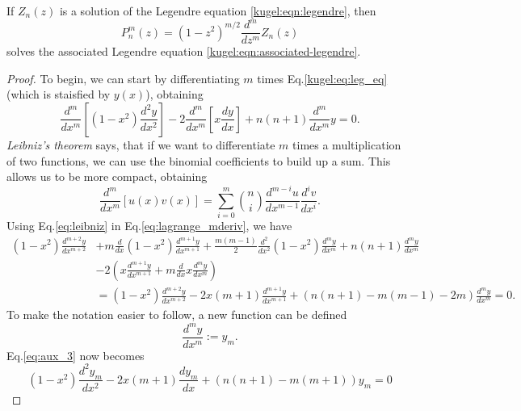 \begin{lemma}\label{kugel:lemma:sol_associated_leg_eq}
  If $Z_n(z)$ is a solution of the Legendre equation \eqref{kugel:eqn:legendre},
  then
  \begin{equation*}
    P^m_n(z) = (1 - z^2)^{m/2} \frac{d^m}{dz^m}Z_n(z)
  \end{equation*}
  solves the associated Legendre equation \eqref{kugel:eqn:associated-legendre}.
\end{lemma}
\begin{proof}
    To begin, we can start by differentiating $m$ times Eq.\eqref{kugel:eq:leg_eq} (which is staisfied by $y(x)$), obtaining
    \begin{equation}\label{eq:lagrange_mderiv}
    \frac{d^m}{dx^m}\left[ (1-x^2)\frac{d^2y}{dx^2} \right] -2 \frac{d^m}{dx^m}\left[ x\frac{dy}{dx} \right] + n(n+1)\frac{d^m}{dx^m}y=0.
    \end{equation}
    \emph{Leibniz's theorem} says, that if we want to differentiate $m$ times a multiplication of two functions, we can use the binomial coefficients to build up a sum. This allows us to be more compact, obtaining 
    \begin{equation}\label{eq:leibniz}
    \frac{d^m}{dx^m}[u(x)v(x)] = \sum_{i=0}^m \binom{n}{i} \frac{d^{m-i}u}{dx^{m-1}} \frac{d^{i}v}{dx^i}.
    \end{equation}
    Using Eq.\eqref{eq:leibniz} in Eq.\eqref{eq:lagrange_mderiv}, we have
    \begin{align}
    (1-x^2)\frac{d^{m+2}y}{dx^{m+2}} &+ m \frac{d}{dx}(1-x^2)\frac{d^{m+1}y}{dx^{m+1}} + \frac{m(m-1)}{2}\frac{d^{2}}{dx^{2}}(1-x^2)\frac{d^{m}y}{dx^{m}} + n(n+1)\frac{d^m{}y}{dx^{m}} \nonumber \\
    &-2\left(x\frac{d^{m+1}y}{dx^{m+1}} + m\frac{d}{dx}x\frac{d^{m}y}{dx^{m}} \right) \nonumber \\
    &= (1-x^2)\frac{d^{m+2}y}{dx^{m+2}} -2x(m+1)\frac{d^{m+1}y}{dx^{m+1}}+(n(n+1)-m(m-1)-2m)\frac{d^{m}y}{dx^{m}}=0. \label{eq:aux_3}
    \end{align}
    To make the notation easier to follow, a new function can be defined
    \begin{equation*}
    \frac{d^{m}y}{dx^{m}} := y_m.
    \end{equation*}
    Eq.\eqref{eq:aux_3} now becomes
    \begin{equation}\label{eq:1st_subs}
    (1-x^2)\frac{d^{2}y_m}{dx^{2}} -2x(m+1)\frac{dy_m}{dx}+(n(n+1)-m(m+1))y_m=0

\end{equation}
\end{proof}
